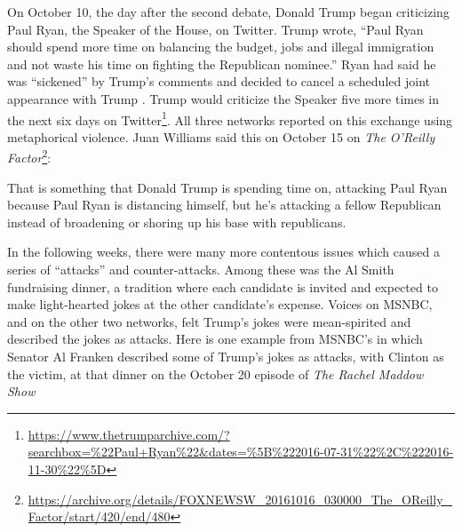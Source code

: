 


On October 10, the day after the second debate, Donald Trump began criticizing Paul 
Ryan, the Speaker of the House, on Twitter. Trump 
wrote, ``Paul Ryan should spend more time on balancing the budget, jobs and 
illegal immigration and not waste his time on fighting the Republican nominee.''
Ryan had said he was ``sickened'' by Trump's comments and decided to cancel a
scheduled joint appearance with Trump \cite{Fahrentold2016}.
Trump would criticize the Speaker five more times in
the next six days on Twitter\footnote{\url{https://www.thetrumparchive.com/?searchbox=\%22Paul+Ryan\%22&dates=\%5B\%222016-07-31\%22\%2C\%222016-11-30\%22\%5D}}.
All three networks reported on this exchange using metaphorical
violence. Juan Williams said this on October 15 on \emph{The O'Reilly Factor}\footnote{\url{https://archive.org/details/FOXNEWSW_20161016_030000_The_OReilly_Factor/start/420/end/480}}:

\begin{exe}
  \ex That is something that Donald Trump is spending time on, attacking Paul
  Ryan because Paul Ryan is distancing himself, but he's attacking a fellow
  Republican instead of broadening or shoring up his base with republicans.
\end{exe}

In the following weeks, there were many more contentous issues which caused a
series of ``attacks'' and counter-attacks. Among these was the Al Smith 
fundraising dinner, a tradition where each candidate is invited and expected
to make light-hearted jokes at the other candidate's expense. 
Voices on MSNBC, and on the other two networks, felt
Trump's jokes were mean-spirited and described the jokes as attacks.
Here is one example from MSNBC's in which 
Senator Al Franken described some of Trump's jokes as attacks, 
with Clinton as the victim, at that dinner on the October 20 episode of
\emph{The Rachel Maddow Show}

